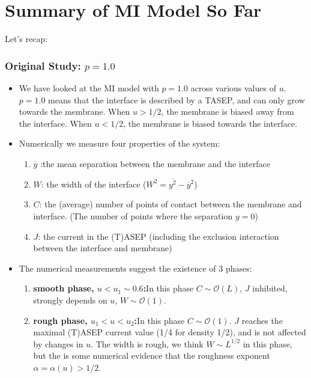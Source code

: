 \documentclass[a4paper,10pt]{article}
\newcommand{\Or}{\mathcal{O}}
\begin{document}
\newpage\phantom{blah}
\section{Summary of MI Model So Far}

Let's recap:

\subsubsection*{Original Study: $p=1.0$}

\begin{itemize}
 \item We have looked at the MI model with $p=1.0$ across various values of $u$. $p=1.0$ means that the interface is described by a TASEP, and can only grow towards the membrane. When $u>1/2$, the membrane is biased away from the interface. When $u < 1/2$, the membrane is biased towards the interface.
 \item Numerically we measure four properties of the system:
  \begin{enumerate}
   \item $\overline{y}$ :the mean separation between the membrane and the interface
   \item $W$: the width of the interface ($W^2 = \overline{y^2} - \overline{y}^2$)
   \item $C$: the (average) number of points of contact between the membrane and interface. (The number of points where the separation $y=0$)
   \item $J$: the current in the (T)ASEP (including the exclusion interaction between the interface and membrane)
  \end{enumerate}
 \item The numerical measurements suggest the existence of 3 phases:
  \begin{enumerate}
   \item {\bf smooth phase, $u < u_1 \sim 0.6$:}\newline In this phase $C \sim \Or(L)$, $J$ inhibited, strongly depends on $u$, $W \sim \Or(1)$.
   \item {\bf rough phase, $u_1 < u < u_2$:}\newline In this phase $C \sim \Or(1)$. $J$ reaches the maximal (T)ASEP current value (1/4 for density 1/2), and is not affected by changes in $u$. The width is rough, we think $W\sim L^{1/2}$ in this phase, but the is some numerical evidence that the roughness exponent $\alpha = \alpha(u)>1/2$.

\end{enumerate}
\end{itemize}
\end{document}
